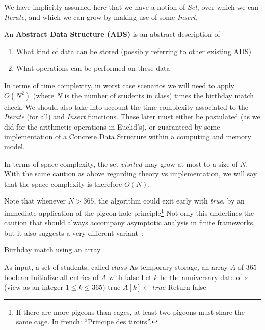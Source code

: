 \documentclass[12pt]{article}
\theoremstyle{plain}
\theoremstyle{remark}
\begin{document}
We have implicitly assumed here that we have a notion of {\it Set}, over which we can
{\it Iterate}, and which we can grow by making use of some {\it Insert}.

\medskip

An {\bf Abstract Data Structure (ADS)} is an abstract description of 
\begin{enumerate}
\item What kind of data can be stored (possibly referring to other existing ADS)
\item What operations can be performed on these data
\end{enumerate}


In terms of time complexity, in worst case scenarios we will need to apply
$O(N^2)$ (where $N$ is the number of students in class) times the birthday match
check. We should also take into account the time complexity associated to the
{\it Iterate} (for all) and {\it Insert} functions. These later must either be
postulated (as we did for the arithmetic operations in Euclid's), or guaranteed 
by some implementation of a Concrete Data Structure within a computing and
memory model.

\medskip

In terms of space complexity, the set $visited$ may grow at most to a size of
$N$. With the same caution as above regarding theory vs implementation, we will say that 
the space complexity is therefore $O(N)$.


Note that whenever $N > 365$, the algorithm could exit early with {\it true}, by
an immediate application of the pigeon-hole principle\footnote{If there are more pigeons than
cages, at least two pigeons must share the same cage. In french: ``Principe des
tiroirs''.} Not only this underlines
the caution that should always accompany asymptotic analysis in finite
frameworks, but it also suggests a very different variant~: 

\begin{algorithm}[H]
\caption{Birthday match using an array}
\begin{algorithmic}
\Require As input, a set of students, called $class$
\Require As temporary storage, an array $A$ of 365 boolean
\State Initialize all entries of $A$ with false
\State Let $k$ be the anniversary date of $s$ (view as an integer $1 \leq k \leq 365$)
\State \Return true
\Else
\State $A[k] \gets true$
\EndIf
\EndFor
\State Return false
\end{algorithmic}
\end{algorithm}
\end{document}

